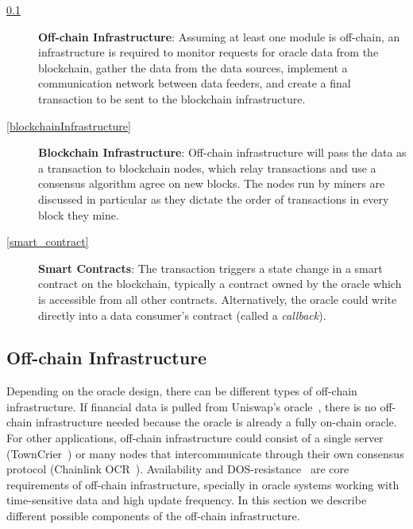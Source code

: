 \begin{description}
	
	\item[\ref{offChainInfrastructure}] \textbf{Off-chain Infrastructure}: Assuming at least one module is off-chain, an infrastructure is required to monitor requests for oracle data from the blockchain, gather the data from the data sources, implement a communication network between data feeders, and create a final transaction to be sent to the blockchain infrastructure.
	

	\item[\ref{blockchainInfrastructure}] \textbf{Blockchain Infrastructure}: Off-chain infrastructure will pass the data as a transaction to blockchain nodes, which relay transactions and use a consensus algorithm agree on new blocks. The nodes run by miners are discussed in particular as they dictate the order of transactions in every block they mine. 


	\item[\ref{smart_contract}] \textbf{Smart Contracts}: The transaction triggers a state change in a smart contract on the blockchain, typically a contract owned by the oracle which is accessible from all other contracts. Alternatively, the oracle could write directly into a data consumer's contract (called a \textit{callback}).
	
\end{description}

\subsection{Off-chain Infrastructure}  \label{offChainInfrastructure}

Depending on the oracle design, there can be different types of off-chain infrastructure. If financial data is pulled from Uniswap's oracle~\cite{uniswaporacle}, there is no off-chain infrastructure needed because the oracle is already a fully on-chain oracle. For other applications, off-chain infrastructure could consist of a single server (\eg TownCrier~\cite{zhang2016town}) or many nodes that intercommunicate through their own consensus protocol (\eg Chainlink OCR~\cite{chainlinkocr}). Availability and DOS-resistance~\cite{sonar2014survey} are core requirements of off-chain infrastructure, specially in oracle systems working with time-sensitive data and high update frequency. In this section we describe different possible components of the off-chain infrastructure.

